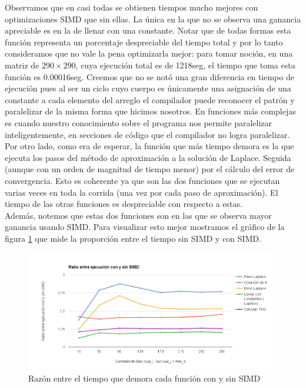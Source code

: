 \documentclass[a4paper]{article}
\begin{document}
Observamos que en casi todas se obtienen tiempos mucho mejores con 
optimizaciones SIMD que sin ellas. La única en la que no se observa 
una ganancia apreciable es en la de llenar con una constante. Notar 
que de todas formas esta función representa un porcentaje despreciable 
del tiempo total y por lo tanto consideramos que no vale la pena 
optimizarla mejor: para tomar noción, en una matriz de $290 \times 290$, 
cuya ejecución total es de 
1218seg, el tiempo que toma esta función es 0.00016seg. Creemos que no se 
notó una gran diferencia en tiempo de ejecución pues al ser un ciclo 
cuyo cuerpo es únicamente una asignación de una constante a cada 
elemento del arreglo el compilador puede reconocer el patrón y 
paralelizar de la misma forma que hicimos nosotros. En funciones 
más complejas es cuando nuestro conocimiento sobre el programa nos 
permite paralelizar inteligentemente, en secciones de código que el compilador 
no logra paralelizar. \\

Por otro lado, como era de esperar, la función que más tiempo demora 
es la que ejecuta los pasos del método de aproximación a la solución 
de Laplace. Seguida (aunque con un orden de magnitud de tiempo menor) 
por el cálculo del error de convergencia. Esto es coherente ya que 
son las dos funciones que se ejecutan varias veces en toda la corrida 
(una vez por cada paso de aproximación). El tiempo de las otras 
funciones es despreciable con respecto a estas. \\

Además, notemos que estas dos funciones son en las que se observa 
mayor ganancia usando SIMD. Para visualizar esto mejor mostramos el 
gráfico de la figura \ref{fig:RatioSIMD} que mide la proporción entre 
el tiempo sin SIMD y con SIMD. \\

\begin{figure}
  \centering
	\includegraphics[width=.8\linewidth]{images/RatioSIMD.png}
  \caption{Razón entre el tiempo que demora cada función con y sin SIMD}
  \label{fig:RatioSIMD}
\end{figure}
\end{document}
